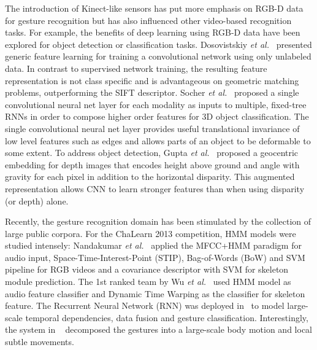 The introduction of  Kinect-like sensors has put more emphasis on RGB-D data for gesture recognition but has also influenced other video-based recognition tasks.
For example, the benefits of deep learning using RGB-D data have been explored for object detection or classification tasks.
%
Dosovistskiy \emph{et al.}~\cite{DosovitskiySRB14} presented generic feature learning for training a convolutional network using only unlabeled data. In contrast to supervised network training, the resulting feature representation is not class specific and is advantageous on geometric matching problems, outperforming the SIFT descriptor.
Socher \emph{et al.}~\cite{socher2012convolutional} proposed a single convolutional neural net layer for each modality as inputs to multiple, fixed-tree RNNs in order to compose higher order features for 3D object classification. The single convolutional neural net layer provides useful translational invariance of low level features such as edges and allows parts of an object to be deformable to some extent.
To address object detection, Gupta \emph{et al.}~\cite{gupta2014learning} proposed a geocentric embedding for depth images that encodes height above ground and angle with gravity for each pixel in addition to the horizontal disparity.
This augmented representation allows CNN to learn stronger features than when using disparity (or depth) alone.

Recently, the gesture recognition domain has been stimulated by the collection of large public corpora.
For the ChaLearn 2013 competition, HMM models were studied intensely:
Nandakumar \emph{et al.}~\cite{nandakumar2013multi} applied the MFCC+HMM paradigm for audio input, Space-Time-Interest-Point (STIP), Bag-of-Words (BoW) and SVM pipeline for RGB videos and a covariance descriptor with SVM for skeleton module prediction. The 1st ranked team by Wu \emph{et al.}~\cite{wu2013fusing} used HMM model as audio feature classifier and Dynamic Time Warping as the classifier for skeleton feature.  The Recurrent Neural Network (RNN) was deployed in~\cite{neverova2013multi} to model large-scale temporal dependencies, data fusion and gesture classification.  Interestingly, the system in ~\cite{neverova2013multi} decomposed the gestures into a large-scale body motion and local subtle movements.

